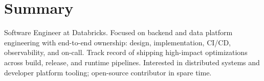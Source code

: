 \section{Summary}
\small{Software Engineer at Databricks. Focused on backend and data platform engineering with end-to-end ownership: design, implementation, CI/CD, observability, and on-call. Track record of shipping high-impact optimizations across build, release, and runtime pipelines. Interested in distributed systems and developer platform tooling; open-source contributor in spare time.}
\vspace{-5pt}